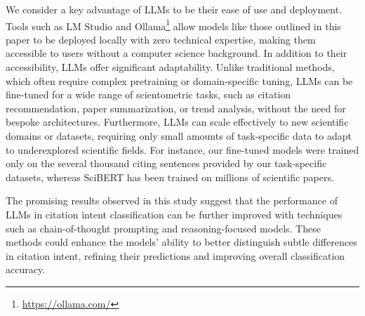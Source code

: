 We consider a key advantage of LLMs to be their ease of use and deployment. Tools such as LM Studio and Ollama\footnote{\url{https://ollama.com/}} allow models like those outlined in this paper to be deployed locally with zero technical expertise, making them accessible to users without a computer science background. 
In addition to their accessibility, LLMs offer significant adaptability. Unlike traditional methods, which often require complex pretraining or domain-specific tuning, LLMs can be fine-tuned for a wide range of scientometric tasks, such as citation recommendation, paper summarization, or trend analysis, without the need for bespoke architectures. Furthermore, LLMs can scale effectively to new scientific domains or datasets, requiring only small amounts of task-specific data to adapt to underexplored scientific fields. For instance, our fine-tuned models were trained only on the several thousand citing sentences provided by our task-specific datasets, whereas SciBERT has been trained on millions of scientific papers.



The promising results observed in this study suggest that the performance of LLMs in citation intent classification can be further improved with techniques such as chain-of-thought prompting and reasoning-focused models. These methods could enhance the models' ability to better distinguish subtle differences in citation intent, refining their predictions and improving overall classification accuracy.


